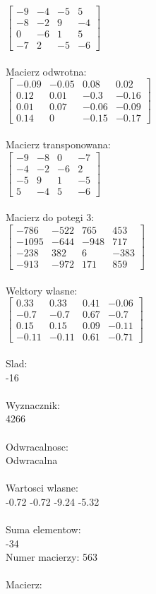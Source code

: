 \documentclass[a4paper,12pt]{article}
\begin{document}
$\begin{bmatrix} -9&-4&-5&5\\-8&-2&9&-4\\0&-6&1&5\\-7&2&-5&-6 \end{bmatrix}$
\\
\\
Macierz odwrotna:\\

$\begin{bmatrix} -0.09&-0.05&0.08&0.02\\0.12&0.01&-0.3&-0.16\\0.01&0.07&-0.06&-0.09\\0.14&0&-0.15&-0.17 \end{bmatrix}$
\\
\\
Macierz transponowana:\\

$\begin{bmatrix} -9&-8&0&-7\\-4&-2&-6&2\\-5&9&1&-5\\5&-4&5&-6 \end{bmatrix}$
\\
\\
Macierz do potegi 3:\\

$\begin{bmatrix} -786&-522&765&453\\-1095&-644&-948&717\\-238&382&6&-383\\-913&-972&171&859 \end{bmatrix}$
\\
\\
Wektory wlasne:\\

$\begin{bmatrix} 0.33&0.33&0.41&-0.06\\-0.7&-0.7&0.67&-0.7\\0.15&0.15&0.09&-0.11\\-0.11&-0.11&0.61&-0.71 \end{bmatrix}$
\\
\\
Slad:\\
-16
\\
\\
Wyznacznik:\\
4266
\\
\\
Odwracalnosc:\\
Odwracalna
\\
\\
Wartosci wlasne:\\
-0.72 -0.72 -9.24 -5.32
\\
\\
Suma elementow:\\
-34
\\
\newpage
Numer macierzy:
563
\\
\\
Macierz:\\
\end{document}
